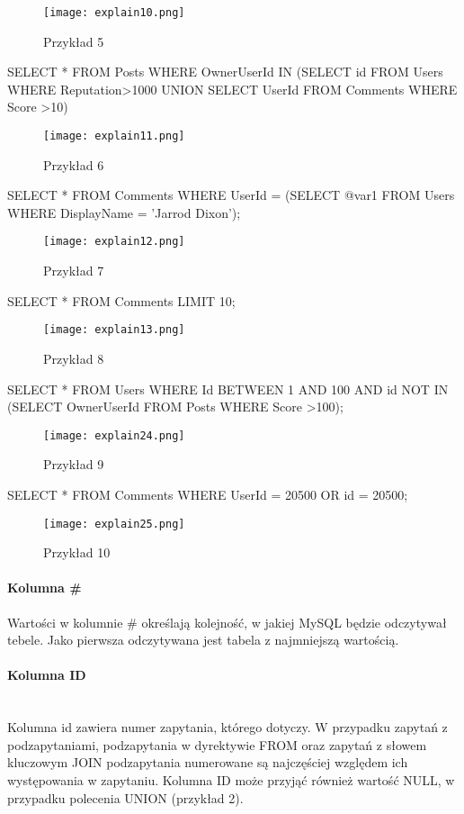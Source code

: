 \begin{figure}[H]
	\texttt{[image: explain10.png]} 
	\caption{Przykład 5}
\end{figure}
\begin{spverbatim}
	SELECT * FROM Posts  WHERE OwnerUserId IN (SELECT id FROM Users WHERE Reputation>1000 UNION SELECT UserId FROM Comments WHERE Score >10)
\end{spverbatim}
\begin{figure}[H]
	\texttt{[image: explain11.png]} 
	\caption{Przykład 6}
\end{figure}
\begin{spverbatim}
	SELECT * FROM Comments WHERE UserId = (SELECT @var1 FROM Users WHERE DisplayName = 'Jarrod Dixon');
\end{spverbatim}
\begin{figure}[H]
	\texttt{[image: explain12.png]} 
	\caption{Przykład 7}
\end{figure}
\begin{spverbatim}
SELECT * FROM Comments LIMIT 10;
\end{spverbatim}
\begin{figure}[H]
	\texttt{[image: explain13.png]} 
	\caption{Przykład 8}
\end{figure}
\begin{spverbatim}
	SELECT * FROM Users WHERE Id BETWEEN 1 AND 100 AND 
	id NOT IN (SELECT OwnerUserId FROM Posts WHERE Score >100);
\end{spverbatim}
\begin{figure}[H]
	\texttt{[image: explain24.png]} 
	\caption{Przykład 9}
\end{figure}
\begin{spverbatim}
	SELECT * FROM Comments WHERE UserId = 20500 OR id = 20500;
\end{spverbatim}
\begin{figure}[H]
	\texttt{[image: explain25.png]} 
	\caption{Przykład 10}
\end{figure}

\paragraph{Kolumna \#}
Wartości w kolumnie \# określają kolejność, w jakiej MySQL będzie odczytywał tebele. Jako pierwsza odczytywana jest tabela z najmniejszą wartością.

\paragraph{Kolumna ID}\leavevmode\\
Kolumna id zawiera numer zapytania, którego dotyczy. W przypadku zapytań z podzapytaniami, podzapytania w dyrektywie FROM oraz zapytań z słowem kluczowym JOIN podzapytania numerowane są najczęściej względem ich występowania w zapytaniu. Kolumna ID może przyjąć również wartość NULL, w przypadku polecenia UNION (przykład 2).

